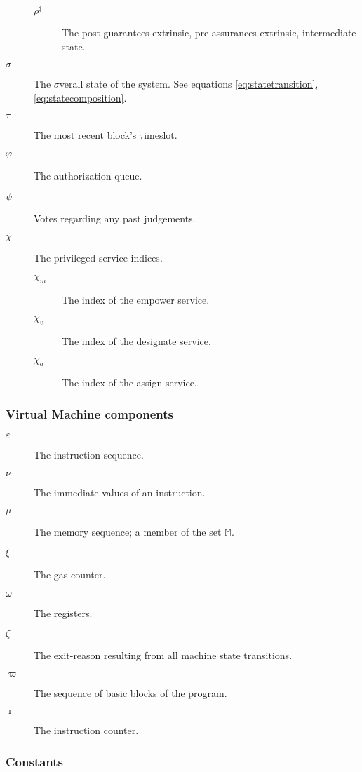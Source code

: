 \begin{description}
\begin{description}
    \item[$\rho^\ddagger$] The post-guarantees-extrinsic, pre-assurances-extrinsic, intermediate state. %
  \end{description}
  \item[$\sigma$] The $\sigma$verall state of the system. See equations \ref{eq:statetransition}, \ref{eq:statecomposition}. %
  \item[$\tau$] The most recent block's $\tau$imeslot. %
  \item[$\varphi$] The authorization queue. %
  \item[$\psi$] Votes regarding any past judgements. %
  \item[$\chi$] The privileged service indices. %
  \begin{description}
    \item[$\chi_m$] The index of the empower service.
    \item[$\chi_v$] The index of the designate service.
    \item[$\chi_a$] The index of the assign service.
  \end{description}
\end{description}

\subsubsection{Virtual Machine components}

\begin{description}
  \item[$\varepsilon$] The instruction sequence. %
  \item[$\nu$] The immediate values of an instruction. %
  \item[$\mu$] The memory sequence; a member of the set $\mathbb{M}$. %
  \item[$\xi$] The gas counter. %
  \item[$\omega$] The registers. %
  \item[$\zeta$] The exit-reason resulting from all machine state transitions. %
  \item[$\varpi$] The sequence of basic blocks of the program.
  \item[$\imath$] The instruction counter.
\end{description}

\subsubsection{Constants}

